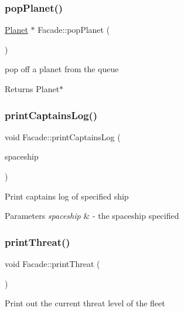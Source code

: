 \subsubsection{\texorpdfstring{pop\+Planet()}{popPlanet()}}
{\footnotesize\ttfamily \hyperlink{classPlanet}{Planet} $\ast$ Facade\+::pop\+Planet (\begin{DoxyParamCaption}{ }\end{DoxyParamCaption})}

pop off a planet from the queue \begin{DoxyReturn}{Returns}
Planet$\ast$ 
\end{DoxyReturn}
\mbox{\label{classFacade_a1e5bd61cd66ac14d31c02b2c1eebc015}} 
\subsubsection{\texorpdfstring{print\+Captains\+Log()}{printCaptainsLog()}}
{\footnotesize\ttfamily void Facade\+::print\+Captains\+Log (\begin{DoxyParamCaption}\item[{\hyperlink{classSpaceship}{Spaceship} $\ast$}]{spaceship }\end{DoxyParamCaption})}

Print captains log of specified ship 
\begin{DoxyParams}{Parameters}
{\em spaceship} & -\/ the spaceship specified \\
\hline
\end{DoxyParams}
\mbox{\label{classFacade_a26a101d8f1a70a6af2eee1af45ca3ab8}} 
\subsubsection{\texorpdfstring{print\+Threat()}{printThreat()}}
{\footnotesize\ttfamily void Facade\+::print\+Threat (\begin{DoxyParamCaption}{ }\end{DoxyParamCaption})}

Print out the current threat level of the fleet \mbox{\label{classFacade_aac0e65b823a1bbb8d824ff12c572144b}} 
